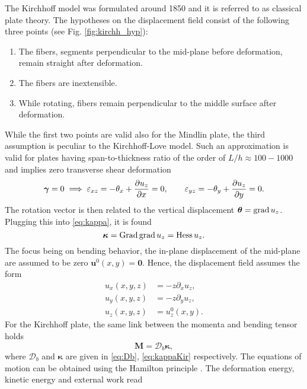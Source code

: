 The Kirchhoff model was formulated around 1850 and it is referred to as classical plate theory. The hypotheses on the displacement field consist of the following three points (see Fig. \ref{fig:kirchh_hyp}):
\begin{enumerate}
\item The fibers, segments perpendicular to the mid-plane before deformation, remain straight after deformation.
\item The fibers are inextensible.
\item While rotating, fibers remain perpendicular to the
middle surface after deformation.
\end{enumerate}
While the first two points are valid also for the Mindlin plate, the third assumption is  peculiar to the Kirchhoff-Love model. Such an approximation is valid for plates having span-to-thickness ratio of the order of $L/h \approx 100 - 1000$ and implies zero transverse shear deformation
\begin{equation*}
\bm{\gamma}=0 \implies \varepsilon_{xz}= - \theta_x + \diffp{u_z}{x} = 0, \qquad \varepsilon_{yz}=-\theta_y + \diffp{u_z}{y} = 0.
\end{equation*}
The rotation vector is then related to the vertical displacement $\bm{\theta} = \operatorname*{grad} u_z$. Plugging this into \eqref{eq:kappa}, it is found
\begin{equation}\label{eq:kappaKir}
	\bm{\kappa} = \operatorname*{Grad} \operatorname*{grad} u_z = \operatorname*{Hess} u_z.
\end{equation}
The focus being on bending behavior, the in-plane displacement of the mid-plane are assumed to be zero $\bm{u}^0(x,y)=\bm{0}$. Hence, the displacement field assumes the form
\begin{equation}
\begin{aligned}
u_x(x,y,z) &= -z \partial_x {u_z}, \\
u_y(x,y,z) &= -z \partial_y {u_z}, \\
u_z(x,y,z) &= u_z^0(x,y).
\end{aligned}
\end{equation}
For the Kirchhoff plate, the same link between the momenta and bending tensor holds
\begin{equation*} 
\bm{M} = \bm{\mathcal{D}}_b \bm{\kappa},
\end{equation*} 
where $\bm{\mathcal{D}}_b$ and $\bm{\kappa}$ are given in \eqref{eq:Db}, \eqref{eq:kappaKir} respectively. The equations of motion can be obtained using the Hamilton principle \cite[Chapter 2]{reddy2006theory}. The deformation energy, kinetic energy and external work read
